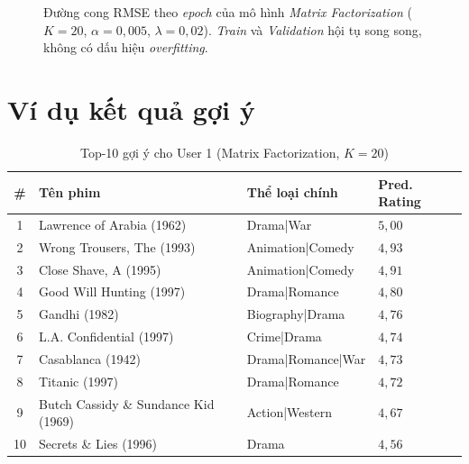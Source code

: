 \documentclass[../BTL.tex]{subfiles}
\begin{document}
\begin{figure}[H]
\caption{Đường cong RMSE theo \textit{epoch} của mô hình
\textit{Matrix Factorization} ($K=20$, $\alpha=0{,}005$, $\lambda=0{,}02$).
\textit{Train} và \textit{Validation} hội tụ song song, không có dấu hiệu
\textit{overfitting}.}
\label{fig:loss_curve}
\end{figure}

\section{Ví dụ kết quả gợi ý}
\label{section:3.8}

\begin{table}[H]
    \centering
    \caption{Top-10 gợi ý cho User 1 (Matrix Factorization, $K=20$)}
    \label{tab:top10}
    \begin{tabular}{clll}
        \toprule
        \textbf{\#} & \textbf{Tên phim}
            & \textbf{Thể loại chính} & \textbf{Pred. Rating} \\
        \midrule
        1  & Lawrence of Arabia (1962)
           & Drama|War             & $5{,}00$ \\
        2  & Wrong Trousers, The (1993)
           & Animation|Comedy      & $4{,}93$ \\
        3  & Close Shave, A (1995)
           & Animation|Comedy      & $4{,}91$ \\
        4  & Good Will Hunting (1997)
           & Drama|Romance         & $4{,}80$ \\
        5  & Gandhi (1982)
           & Biography|Drama       & $4{,}76$ \\
        6  & L.A. Confidential (1997)
           & Crime|Drama           & $4{,}74$ \\
        7  & Casablanca (1942)
           & Drama|Romance|War     & $4{,}73$ \\
        8  & Titanic (1997)
           & Drama|Romance         & $4{,}72$ \\
        9  & Butch Cassidy \& Sundance Kid (1969)
           & Action|Western        & $4{,}67$ \\
        10 & Secrets \& Lies (1996)
           & Drama                 & $4{,}56$ \\
        \bottomrule
    \end{tabular}
\end{table}
\end{document}
